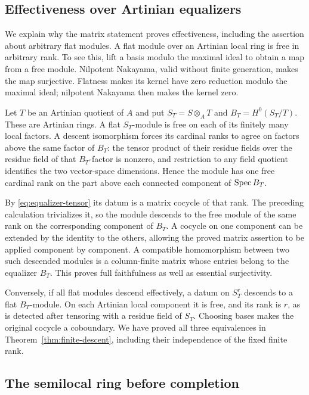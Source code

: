 \subsection{Effectiveness over Artinian equalizers}

We explain why the matrix statement proves effectiveness, including the assertion about arbitrary flat modules. A flat module over an Artinian local ring is free in arbitrary rank. To see this, lift a basis modulo the maximal ideal to obtain a map from a free module. Nilpotent Nakayama, valid without finite generation, makes the map surjective. Flatness makes its kernel have zero reduction modulo the maximal ideal; nilpotent Nakayama then makes the kernel zero.

Let $T$ be an Artinian quotient of $A$ and put $S_T=S\otimes_AT$ and $B_T=H^0(S_T/T)$. These are Artinian rings. A flat $S_T$-module is free on each of its finitely many local factors. A descent isomorphism forces its cardinal ranks to agree on factors above the same factor of $B_T$: the tensor product of their residue fields over the residue field of that $B_T$-factor is nonzero, and restriction to any field quotient identifies the two vector-space dimensions. Hence the module has one free cardinal rank on the part above each connected component of $\operatorname{Spec} B_T$.

By \eqref{eq:equalizer-tensor} its datum is a matrix cocycle of that rank. The preceding calculation trivializes it, so the module descends to the free module of the same rank on the corresponding component of $B_T$. A cocycle on one component can be extended by the identity to the others, allowing the proved matrix assertion to be applied component by component. A compatible homomorphism between two such descended modules is a column-finite matrix whose entries belong to the equalizer $B_T$. This proves full faithfulness as well as essential surjectivity.

Conversely, if all flat modules descend effectively, a datum on $S_T^r$ descends to a flat $B_T$-module. On each Artinian local component it is free, and its rank is $r$, as is detected after tensoring with a residue field of $S_T$. Choosing bases makes the original cocycle a coboundary. We have proved all three equivalences in Theorem~\ref{thm:finite-descent}, including their independence of the fixed finite rank.

\subsection{The semilocal ring before completion}

